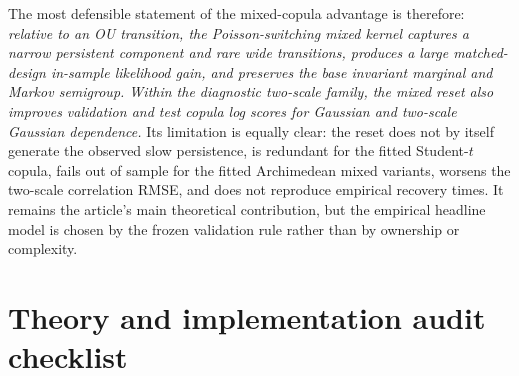 \documentclass[11pt]{article}
\newcommand{\1}{\mathbf{1}}
\begin{document}
The most defensible statement of the mixed-copula advantage is therefore:
\emph{relative to an OU transition, the Poisson-switching mixed kernel captures a
narrow persistent component and rare wide transitions, produces a large matched-
design in-sample likelihood gain, and preserves the base invariant marginal and
Markov semigroup.  Within the diagnostic two-scale family, the mixed reset also
improves validation and test copula log scores for Gaussian and two-scale
Gaussian dependence.}  Its limitation is equally clear: the reset does not by
itself generate the observed slow persistence, is redundant for the fitted
Student-$t$ copula, fails out of sample for the fitted Archimedean mixed variants,
worsens the two-scale correlation RMSE, and does not reproduce empirical
recovery times.  It remains the article's main theoretical contribution, but the
empirical headline model is chosen by the frozen validation rule rather than by
ownership or complexity.

\fi
\clearpage
\section{Theory and implementation audit checklist}
\label{emp:app:audit}
\end{document}

